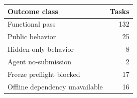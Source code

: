 \begin{tabular}{lr}
\toprule
\textbf{Outcome class} & \textbf{Tasks} \\
\midrule
Functional pass & 132 \\
Public behavior & 25 \\
Hidden-only behavior & 8 \\
Agent no-submission & 2 \\
Freeze preflight blocked & 17 \\
Offline dependency unavailable & 16 \\
\bottomrule
\end{tabular}
